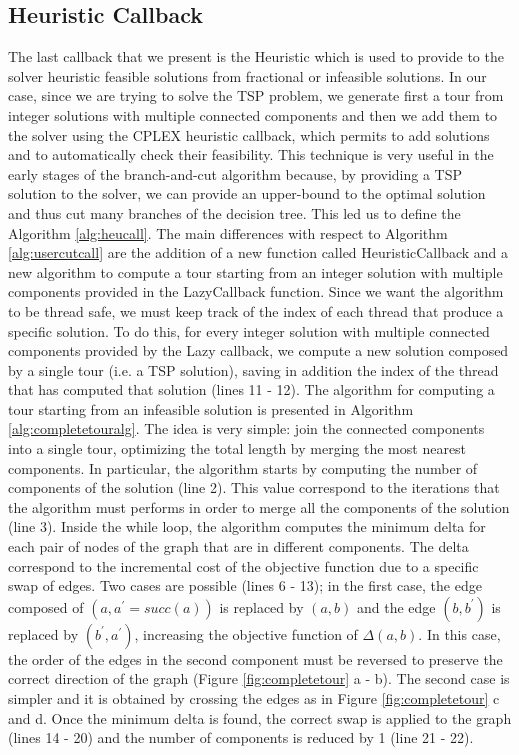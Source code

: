 \subsection{Heuristic Callback}
\label{callHeu}
The last callback that we present is the Heuristic which is used to provide to the solver heuristic feasible solutions from fractional or infeasible solutions. 
In our case, since we are trying to solve the TSP problem, we generate first a tour from integer solutions with multiple connected components and then we add them to the solver using the CPLEX heuristic callback, which permits to add solutions and to automatically check their feasibility. This technique is very useful in the early stages of the branch-and-cut algorithm because, by providing a TSP solution to the solver, we can provide an upper-bound to the optimal solution and thus cut many branches of the decision tree. This led us to define the Algorithm \ref{alg:heucall}. The main differences with respect to Algorithm \ref{alg:usercutcall} are the addition of a new function called HeuristicCallback and a new algorithm to compute a tour starting from an integer solution with multiple components provided in the LazyCallback function. Since we want the algorithm to be thread safe, we must keep track of the index of each thread that produce a specific solution. To do this, for every integer solution with multiple connected components provided by the Lazy callback, we compute a new solution composed by a single tour (i.e. a TSP solution), saving in addition the index of the thread that has computed that solution (lines 11 - 12).
The algorithm for computing a tour starting from an infeasible solution is presented in Algorithm \ref{alg:completetouralg}. The idea is very simple: join the connected components into a single tour, optimizing the total length by merging the most nearest components.
In particular, the algorithm starts by computing the number of components of the solution (line 2). This value correspond to the iterations that the algorithm must performs in order to merge all the components of the solution (line 3). Inside the while loop, the algorithm computes the minimum delta for each pair of nodes of the graph that are in different components. The delta correspond to the incremental cost of the objective function due to a specific swap of edges. Two cases are possible (lines 6 - 13); in the first case, the edge composed of $(a, a^{\prime} = \textit{succ}(a))$ is replaced by $(a, b)$ and the edge $(b, b^{\prime})$ is replaced by $(b^{\prime}, a^{\prime})$, increasing the objective function of $\Delta(a,b)$. In this case, the order of the edges in the second component must be reversed to preserve the correct direction of the graph (Figure \ref{fig:completetour} a - b). The second case is simpler and it is obtained by crossing the edges as in Figure \ref{fig:completetour} c and d. Once the minimum delta is found, the correct swap is applied to the graph (lines 14 - 20) and the number of components is reduced by 1 (line 21 - 22). 
